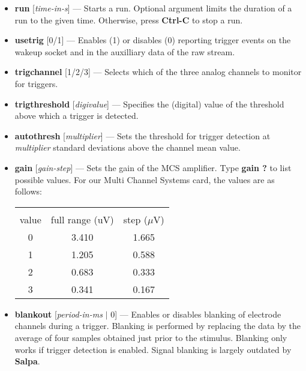 \documentclass[12pt,oneside]{book}
\def\prog#1{{\bf #1}}
\def\cmd#1{{\bf #1}}
\def\arg#1{{\it #1}}
\def\streamtype#1{{\sc #1}\xspace}
\def\raw{\streamtype{raw}}
\def\intr{{\bf Ctrl-C}\xspace}
\begin{document}
\begin{itemize}
\item \cmd{run} [\arg{time-in-s}] --- Starts a run. Optional argument limits
the duration of a run to the given time. Otherwise, press \intr to
stop a run.

\item \cmd{usetrig} [0/1] --- Enables (1) or disables (0) reporting
trigger events on the wakeup socket and in the auxilliary data of the
\raw stream. 

\item \cmd{trigchannel} [1/2/3] --- Selects which of the three analog
channels to monitor for triggers.

\item \cmd{trigthreshold} [\arg{digivalue}] --- Specifies the (digital)
value of the threshold above which a trigger is detected.

\item \cmd{autothresh} [\arg{multiplier}] --- Sets the threshold for
trigger detection at {\it multiplier} standard
deviations above the channel mean value.

\item \cmd{gain} [\arg{gain-step}] --- Sets the gain of the MCS amplifier.
Type \cmd{gain ?} to list possible values. For our Multi Channel Systems
card, the values are as follows:
\begin{center}
\begin{tabular}{ccc}
\hline\vspace{-5pt}\\
value & full range ($\mathrm{uV}$) & step ($\mu \mathrm{V}$) \medskip\\
0 & 3.410 & 1.665 \\
1 & 1.205 & 0.588 \\
2 & 0.683 & 0.333 \\
3 & 0.341 & 0.167 \medskip\\
\hline
\end{tabular}
\end{center}

\item \cmd{blankout} [\arg{period-in-ms} $|$ 0] --- Enables or disables
blanking of electrode channels during a trigger. Blanking is performed by
replacing the data by the average of four samples obtained just prior
to the stimulus. Blanking only works if trigger detection is enabled.
Signal blanking is largely outdated by \prog{Salpa}.

\end{itemize}
\end{document}
